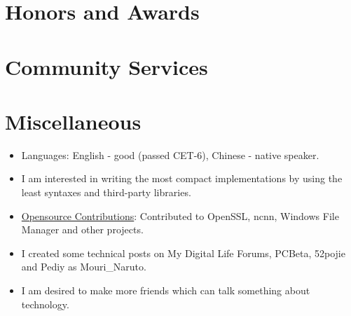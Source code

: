 \documentclass{resume}
\begin{document}
\section{Honors and Awards}


\section{Community Services}


\section{Miscellaneous}
\begin{itemize}

  \item Languages: English - good (passed CET-6),  Chinese - native speaker.

  \item I am interested in writing the most compact implementations by using the least syntaxes and third-party libraries.

  \item \href{https://github.com/search?q=is%3Apr+author%3AMouriNaruto&type=Issues}{Opensource Contributions}: Contributed to OpenSSL, ncnn, Windows File Manager and other projects.
  
  \item I created some technical posts on My Digital Life Forums, PCBeta, 52pojie and Pediy as Mouri\_Naruto.
  
  \item I am desired to make more friends which can talk something about technology.
  
\end{itemize}
\end{document}
